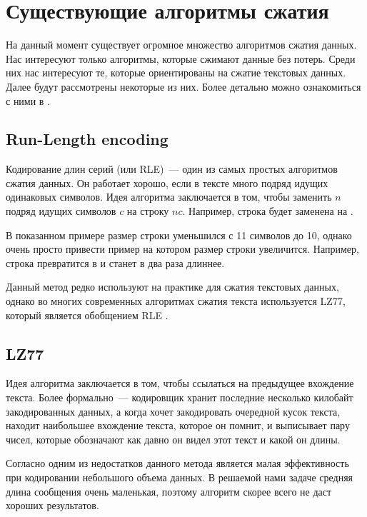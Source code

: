 \section{Существующие алгоритмы сжатия}

На данный момент существует огромное множество алгоритмов сжатия данных. Нас интересуют только алгоритмы, которые сжимают
данные без потерь. Среди них нас интересуют те, которые ориентированы на сжатие текстовых данных. Далее будут рассмотрены некоторые из них.
Более детально можно ознакомиться с ними в \cite{handbook}.

\subsection{Run-Length encoding}
Кодирование длин серий (или RLE)~--- один из самых простых алгоритмов сжатия данных. Он работает хорошо, если в тексте много подряд идущих одинаковых символов.
Идея алгоритма заключается в том, чтобы заменить $n$ подряд идущих символов $c$ на строку $nc$. Например, строка  будет заменена на 
. 

В показанном примере размер строки уменьшился с 11 символов до 10, однако очень просто привести пример на котором размер строки увеличится. 
Например, строка  превратится в  и станет в два раза длиннее.

Данный метод редко используют на практике для сжатия текстовых данных, однако во многих современных алгоритмах 
сжатия текста используется LZ77, который является обобщением RLE \cite{rle-wiki}.

\subsection{LZ77}

Идея алгоритма заключается в том, чтобы ссылаться на предыдущее вхождение текста. Более формально~--- кодировщик хранит последние несколько килобайт закодированных данных,
а когда хочет закодировать очередной кусок текста, находит наибольшее вхождение текста, которое он помнит, и выписывает пару чисел, которые обозначают как давно он видел
этот текст и какой он длины.

Согласно \cite{lz77-wiki} одним из недостатков данного метода является малая эффективность при кодировании небольшого объема данных. В решаемой нами задаче средняя длина 
сообщения очень маленькая, поэтому алгоритм скорее всего не даст хороших результатов.

